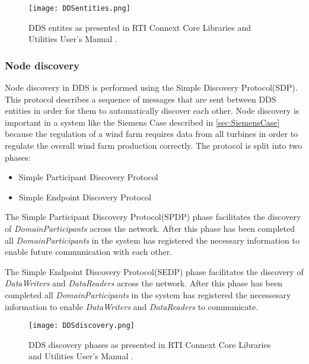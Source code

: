 \begin{figure}
	\centering
	\texttt{[image: DDSentities.png]} 
	\caption[DDS entities]{
		\label{fig:publishSubscribe} 
		\footnotesize{%
			DDS entites as presented in RTI Connext Core Libraries and Utilities User's Manual \cite{rtiConnextUsersManual}.
		}
	}
\end{figure}

\subsubsection{Node discovery}
Node discovery in DDS is performed using the Simple Discovery Protocol(SDP).
This protocol describes a sequence of messages that are sent between DDS entities in order for them to automatically discover each other.
Node discovery is important in a system like the Siemens Case described in \cref{sec:SiemensCase} because the regulation of a wind farm requires data from all turbines in order to regulate the overall wind farm production correctly.
The protocol is split into two phases:

\begin{itemize}
	\item Simple Participant Discovery Protocol
	\item Simple Endpoint Discovery Protocol
\end{itemize}

The Simple Participant Discovery Protocol(SPDP) phase facilitates the discovery of \textit{DomainParticipants} across the network.
After this phase has been completed all \textit{DomainParticipants} in the system has registered the necessary information to enable future communication with each other.

The Simple Endpoint Discovery Protocol(SEDP) phase facilitates the discovery of \textit{DataWriters} and \textit{DataReaders} across the network.
After this phase has been completed all \textit{DomainParticipants} in the system has registered the necessesary information to enable \textit{DataWriters} and \textit{DataReaders} to communicate.

\begin{figure}
	\centering
	\texttt{[image: DDSdiscovery.png]} 
	\caption[DDS discovery phases]{
		\label{fig:publishSubscribe} 
		\footnotesize{%
			DDS discovery phases as presented in RTI Connext Core Libraries and Utilities User's Manual \cite{rtiConnextUsersManual}.
		}
	}
\end{figure}

